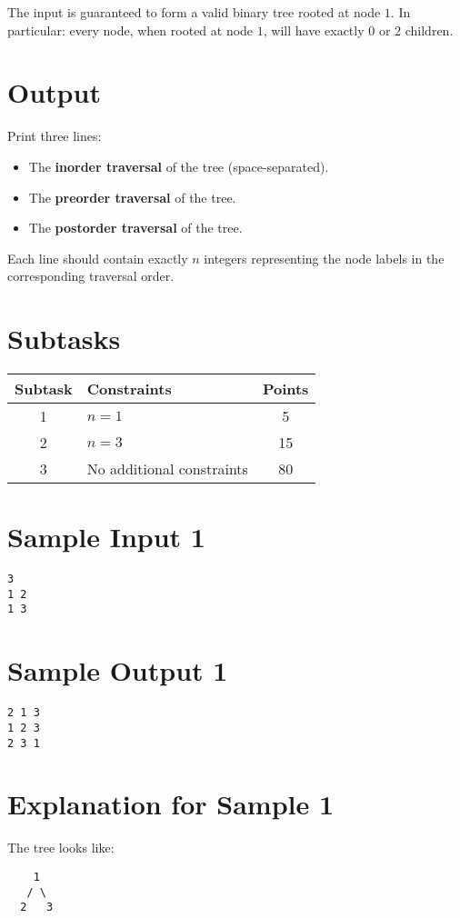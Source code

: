 \documentclass[12pt,a4paper]{article}
\begin{document}
The input is guaranteed to form a valid binary tree rooted at node $1$. In particular: every node, when rooted at node $1$, will have exactly $0$ or $2$ children.

\section*{Output}
Print three lines:
\begin{itemize}
  \item The \textbf{inorder traversal} of the tree (space-separated).  
  \item The \textbf{preorder traversal} of the tree.  
  \item The \textbf{postorder traversal} of the tree.  
\end{itemize}

Each line should contain exactly $n$ integers representing the node labels in the corresponding traversal order.

\section*{Subtasks}
\begin{center}
\begin{tabularx}{\textwidth}{|c|X|c|}
\hline
\textbf{Subtask} & \textbf{Constraints} & \textbf{Points} \\
\hline
1 & $n = 1$ & 5 \\
\hline
2 & $n = 3$ & 15 \\
\hline
3 & No additional constraints & 80 \\
\hline
\end{tabularx}
\end{center}

\section*{Sample Input 1}
\begin{verbatim}
3
1 2
1 3
\end{verbatim}

\section*{Sample Output 1}
\begin{verbatim}
2 1 3
1 2 3
2 3 1
\end{verbatim}

\section*{Explanation for Sample 1}
The tree looks like:
\begin{verbatim}
    1
   / \
  2   3
\end{verbatim}
\end{document}
